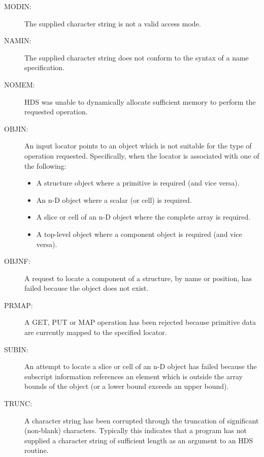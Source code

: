 \documentclass[twoside,11pt]{article}
\newcommand{\htmlref}[2]{#1}
\renewcommand{\_}{\texttt{\symbol{95}}}
\begin{document}
\begin{description}
\begin{itemize}
\end{itemize}

\item [MODIN:]
The supplied character string is not a valid access mode.

\item [NAMIN:]
The supplied character string does not conform to the syntax of a \htmlref{name}{sect:name}
specification.

\item [NOMEM:]
HDS was unable to dynamically allocate sufficient memory to perform the
requested operation.

\item [OBJIN:]
An input \htmlref{locator}{sect:locators} points to an object which is not suitable for the type of
operation requested. Specifically, when the locator is associated with one of
the following:

\begin{itemize}

\item A structure object where a primitive is required (and vice versa).

\item An n-D object where a scalar (or cell) is required.

\item A slice or cell of an n-D object where the complete array is required.

\item A top-level object where a component object is required (and vice versa).

\end{itemize}

\item [OBJNF:]
A request to locate a component of a structure, by \htmlref{name}{sect:name} or position, has failed
because the object does not exist.

\item [PRMAP:]
A GET, PUT or MAP operation has been rejected because primitive data are
currently mapped to the specified \htmlref{locator}{sect:locators}.

\item [SUBIN:]
An attempt to locate a slice or cell of an n-D object has failed because the
subscript information references an element which is outside the array bounds
of the object (or a lower bound exceeds an upper bound).

\item [TRUNC:]
A character string has been corrupted through the truncation of significant
(non-blank) characters. Typically this indicates that a program has not
supplied a character string of sufficient length as an argument to an HDS
routine.


\end{description}
\end{document}
